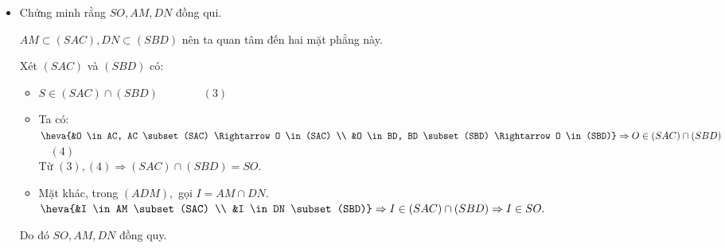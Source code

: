 \begin{bt}
\begin{vd}
{\begin{itemize}
{}
			\item Chứng minh rằng $SO, AM, DN$ đồng qui.
			\begin{note}
				$AM \subset (SAC), DN \subset (SBD)$ nên ta quan tâm đến hai mặt phẳng này.
			\end{note}
			Xét $(SAC)$ và $(SBD)$ có:
			\begin{itemize}
				\item $S \in(SAC) \cap (SBD) \quad\quad\quad\quad (3)$
				\item Ta có: $\heva{&O \in AC, AC \subset (SAC) \Rightarrow O \in(SAC) \\ 
					&O \in BD, BD \subset(SBD) \Rightarrow O \in(SBD)} \Rightarrow O \in (SAC) \cap (SBD)$ $\quad (4)$\\
				Từ $(3),(4) \Rightarrow(SAC) \cap(SBD)=SO.$
				\item Mặt khác, trong $(ADM),$ gọi $I= AM \cap DN$.\\
				$\heva{&I \in AM \subset(SAC) \\ &I \in DN \subset(SBD)} \Rightarrow I \in(SAC) \cap(SBD) \Rightarrow I \in SO.$
			\end{itemize}
			Do đó $SO, AM, DN$ đồng quy.
		\end{itemize}
	}
\end{vd}


\end{bt}
